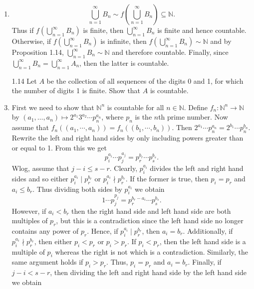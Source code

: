 \documentclass[12pt]{article}
\makeatletter
\theoremstyle{definition}
\theoremstyle{remark}
\renewenvironment{proof}[1][\proofname]{\par
  \pushQED{\qed}%
  \normalfont \topsep6\p@\@plus6\p@\relax
  \list{}{\leftmargin=0mm
          \rightmargin=4mm
          \settowidth{\itemindent}{\itshape#1}%
          \labelwidth=\itemindent
          \parsep=0pt \listparindent=\parindent 
  }
  \item[\hskip\labelsep
        \itshape
    #1\@addpunct{.}]\ignorespaces
}{%
  \popQED\endlist\@endpefalse
}
\let\oldproofname=\proofname
\renewcommand{\proofname}{\bf{\textit{\oldproofname}}}
\makeatother
\begin{document}
\begin{enumerate}[leftmargin=*]
\begin{proof}
                    \begin{equation*}
                        \bigcup_{n=1}^{\infty}B_n\sim f(\bigcup_{n=1}^{\infty}B_n)\subseteq\mathbb{N}.
                    \end{equation*}
                Thus if $f(\bigcup_{n=1}^{\infty}B_n)$ is finite, then $\bigcup_{n=1}^{\infty}B_n$ is finite and hence countable. Otherwise, if $f(\bigcup_{n=1}^{\infty}B_n)$ is infinite, then $f(\bigcup_{n=1}^{\infty}B_n)\sim\mathbb{N}$ and by Proposition 1.14, $\bigcup_{n=1}^{\infty}B_n\sim\mathbb{N}$ and therefore countable. Finally, since $\bigcup_{n=1}^{\infty}B_n=\bigcup_{n=1}^{\infty}A_n$, then the latter is countable.
            \end{proof}
        \item[1.14] Let $A$ be the collection of all sequences of the digits 0 and 1, for which the number of digits 1 is finite. Show that $A$ is countable.
            \begin{proof}
                First we need to show that $\mathbb{N}^n$ is countable for all $n\in\mathbb{N}$. Define $f_n\colon\mathbb{N}^n\rightarrow\mathbb{N}$ by $(a_1,\dots,a_n)\mapsto 2^{a_1}3^{a_2}\cdots p_n^{a_n}$, where $p_n$ is the $n$th prime number. Now assume that $f_n((a_1,\cdots,a_n))=f_n((b_1,\cdots,b_n))$. Then $2^{a_1}\cdots p_n^{a_n}=2^{b_1}\cdots p_n^{b_n}$. Rewrite the left and right hand sides by only including powers greater than or equal to 1. From this we get 
                    \begin{equation*}
                        p_i^{a_i}\cdots p_j^{a_j}=p_r^{b_r}\cdots p_s^{b_s}.
                    \end{equation*}
                Wlog, assume that $j-i\leq s-r$. Clearly, $p_i^{a_i}$ divides the left and right hand sides and so either $p_i^{a_i}\mid p_r^{b_r}$ or $p_i^{a_i}\nmid p_r^{b_r}$. If the former is true, then $p_i=p_r$ and $a_i\leq b_r$. Thus dividing both sides by $p_i^{a_i}$ we obtain
                    \begin{equation*}
                        1\cdots p_j^{p_j}=p_r^{b_r-a_i}\cdots p_s^{b_s}.
                    \end{equation*}
                However, if $a_i<b_r$ then the right hand side and left hand side are both multiples of $p_r$, but this is a contradiction since the left hand side no longer contains any power of $p_r$. Hence, if $p_i^{a_i}\mid p_r^{b_r}$, then $a_i=b_r$. Additionally, if $p_i^{a_i}\nmid p_r^{b_r}$, then either $p_i<p_r$ or $p_i>p_r$. If $p_i<p_r$, then the left hand side is a multiple of $p_i$ whereas the right is not which is a contradiction. Similarly, the same argument holds if $p_i>p_r$. Thus, $p_i=p_r$ and $a_i=b_r$.  Finally, if $j-i<s-r$, then dividing the left and right hand side by the left hand side we obtain

\end{proof}
\end{enumerate}
\end{document}
